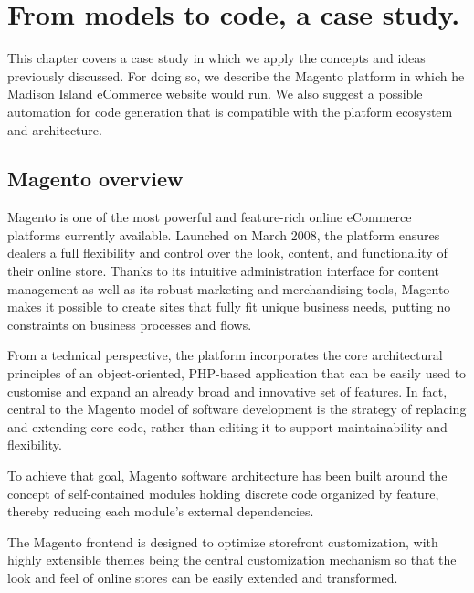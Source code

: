 \chead{}

\chapter{From models to code, a case study.}

This chapter covers a case study in which we apply the concepts and ideas previously discussed. For doing so, we describe the Magento platform in which he Madison Island eCommerce website would run. We also suggest a possible automation for code generation that is compatible with the platform ecosystem and architecture.

\section{Magento overview}

Magento is one of the most powerful and feature-rich online eCommerce platforms currently available. Launched on March 2008, the platform ensures dealers a full flexibility and control over the look, content, and functionality of their online store. Thanks to its intuitive administration interface for content management as well as its robust marketing and merchandising tools, Magento makes it possible to create sites that fully fit unique business needs, putting no constraints on business processes and flows.

From a technical perspective, the platform incorporates the core architectural principles of an object-oriented, PHP-based application that can be easily used to customise and expand an already broad and innovative set of features. In fact, central to the Magento model of software development is the strategy of replacing and extending core code, rather than editing it to support maintainability and flexibility. 

To achieve that goal, Magento software architecture has been built around the concept of self-contained modules holding discrete code organized by feature, thereby reducing each module’s external dependencies.

The Magento frontend is designed to optimize storefront customization, with highly extensible themes being the central customization mechanism so that the look and feel of online stores can be easily extended and transformed.

